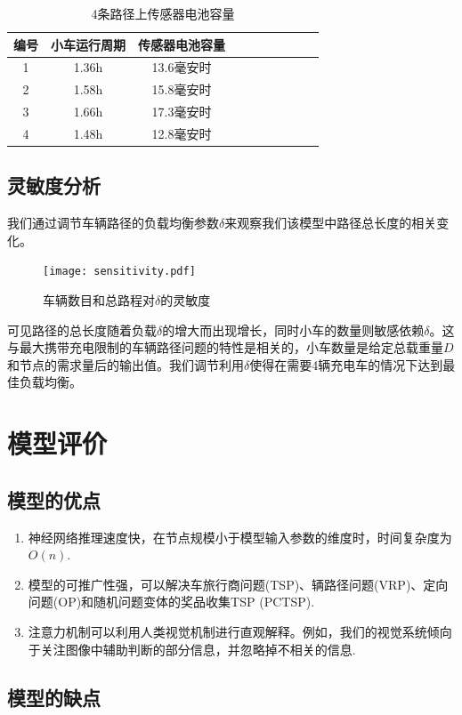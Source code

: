 \documentclass{whutmod}
\begin{document}
\begin{table}[!htbp]
	\caption{4条路径上传感器电池容量}\label{lujing} \centering
	\begin{tabular}{cccccccccc}
		\toprule[1pt]
		编号 & 小车运行周期 & 传感器电池容量\\
		\midrule[1pt]
		1 & 1.36h  & 13.6毫安时 \\
		2 & 1.58h & 15.8毫安时\\
		3 & 1.66h & 17.3毫安时  \\
		4 & 1.48h & 12.8毫安时\\
		\bottomrule[1.5pt]
	\end{tabular}
	\centering
\end{table}
\newpage
\subsection{灵敏度分析}

我们通过调节车辆路径的负载均衡参数$\delta$来观察我们该模型中路径总长度的相关变化。
\begin{figure}[!h]
	\centering
	\texttt{[image: sensitivity.pdf]}
	\caption{车辆数目和总路程对$\delta$的灵敏度}
	\label{fig:sensitivity}%
\end{figure}
可见路径的总长度随着负载$\delta$的增大而出现增长，同时小车的数量则敏感依赖$\delta$。这与最大携带充电限制的车辆路径问题的特性是相关的，小车数量是给定总载重量$D$和节点的需求量后的输出值。我们调节利用$\delta$使得在需要4辆充电车的情况下达到最佳负载均衡。

\section{模型评价}

\subsection{模型的优点}
\begin{enumerate}
	\item 神经网络推理速度快，在节点规模小于模型输入参数的维度时，时间复杂度为$O(n)$.
	\item 模型的可推广性强，可以解决车旅行商问题(TSP)、辆路径问题(VRP)、定向问题(OP)和随机问题变体的奖品收集TSP (PCTSP).
	\item 注意力机制可以利用人类视觉机制进行直观解释。例如，我们的视觉系统倾向于关注图像中辅助判断的部分信息，并忽略掉不相关的信息.
\end{enumerate}

\subsection{模型的缺点}
\end{document}
